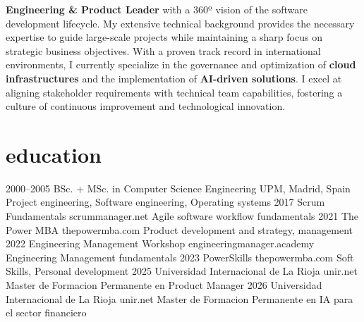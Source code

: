 \documentclass[]{friggeri-cv}
\begin{document}
\textbf{Engineering \& Product Leader} with a 360º vision of the software development lifecycle. 
My extensive technical background provides the necessary expertise to guide large-scale projects 
while maintaining a sharp focus on strategic business objectives. With a proven track record 
in international environments, I currently specialize in the governance and optimization 
of \textbf{cloud infrastructures} and the implementation of \textbf{AI-driven solutions}. 
I excel at aligning stakeholder requirements with technical team capabilities, fostering 
a culture of continuous improvement and technological innovation.


\section{education}

\begin{entrylist}
\entry
{2000--2005}
{BSc. + MSc. {\normalfont in Computer Science Engineering}}
{UPM, Madrid, Spain}
{Project engineering, Software engineering, Operating systems}
\entry
{2017}
{{\normalfont Scrum Fundamentals}}
{scrummanager.net}
{Agile software workflow fundamentals}
\entry
{2021}
{{\normalfont The Power MBA}}
{thepowermba.com}
{Product development and strategy, management}
\entry
{2022}
{{\normalfont Engineering Management Workshop}}
{engineeringmanager.academy}
{Engineering Management fundamentals}
\entry
{2023}
{{\normalfont PowerSkills}}
{thepowermba.com}
{Soft Skills, Personal development}
\entry
{2025}
{{\normalfont Universidad Internacional de La Rioja}}
{unir.net}
{Master de Formacion Permanente en Product Manager}
\entry
{2026}
{{\normalfont Universidad Internacional de La Rioja}}
{unir.net}
{Master de Formacion Permanente en IA para el sector financiero}

\end{entrylist}

\end{document}
